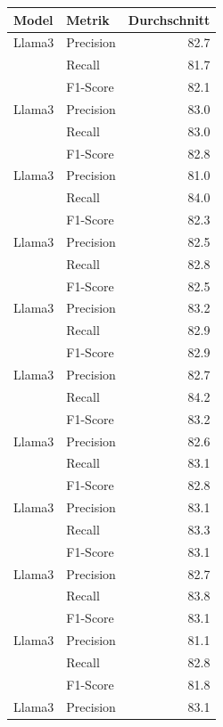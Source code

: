 \begin{table}[!ht]
    \centering
    \small
    \begin{tabular}{llr}
        \toprule
        \textbf{Model} & \textbf{Metrik} & \textbf{Durchschnitt} \\
        \midrule
        Llama3 & Precision & 82.7 \\
        & Recall & 81.7 \\
        & F1-Score & 82.1 \\
        \midrule
        Llama3 & Precision & 83.0 \\
        & Recall & 83.0 \\
        & F1-Score & 82.8 \\
        \midrule
        Llama3 & Precision & 81.0 \\
        & Recall & 84.0 \\
        & F1-Score & 82.3 \\
        \midrule
        Llama3 & Precision & 82.5 \\
        & Recall & 82.8 \\
        & F1-Score & 82.5 \\
        \midrule
        Llama3 & Precision & 83.2 \\
        & Recall & 82.9 \\
        & F1-Score & 82.9 \\
        \midrule
        Llama3 & Precision & 82.7 \\
        & Recall & 84.2 \\
        & F1-Score & 83.2 \\
        \midrule
        Llama3 & Precision & 82.6 \\
        & Recall & 83.1 \\
        & F1-Score & 82.8 \\
        \midrule
        Llama3 & Precision & 83.1 \\
        & Recall & 83.3 \\
        & F1-Score & 83.1 \\
        \midrule
        Llama3 & Precision & 82.7 \\
        & Recall & 83.8 \\
        & F1-Score & 83.1 \\
        \midrule
        Llama3 & Precision & 81.1 \\
        & Recall & 82.8 \\
        & F1-Score & 81.8 \\
        \midrule
        Llama3 & Precision & 83.1 \\

\end{tabular}
\end{table}
